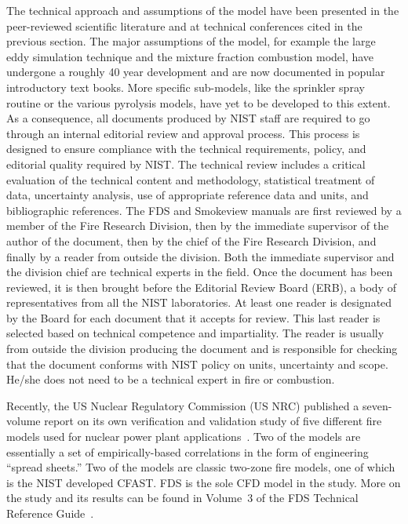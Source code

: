 \documentclass[11pt]{book}
\begin{document}
\label{JustAA}
The technical approach and assumptions of the model have been presented in
the peer-reviewed scientific literature and at technical conferences cited in the previous section.
The major assumptions of the model, for example the large eddy simulation technique and the mixture fraction combustion
model, have undergone a roughly 40 year development and are now documented in popular introductory text books.
More specific sub-models, like the sprinkler spray routine or the various pyrolysis models, have yet to be developed to
this extent. As a consequence, all documents produced by NIST staff are required to go
through an internal editorial review and approval process.
This process is designed to ensure compliance with the technical requirements,
policy, and editorial quality required by NIST.
The technical review includes a critical evaluation of the technical content and
methodology, statistical treatment of data, uncertainty analysis, use of appropriate
reference data and units, and bibliographic references.
The FDS and Smokeview manuals are first reviewed by a member of the Fire Research Division,
then by the immediate supervisor of the author of the document,
then by the chief of the Fire Research Division, and finally by a reader from
outside the division. Both the immediate supervisor and the division chief are
technical experts in the field. Once the document has been reviewed, it is
then brought before the Editorial Review Board (ERB),
a body of representatives from all the NIST laboratories.
At least one reader is designated by the Board for each document that it accepts for
review. This last reader is selected based on technical competence and impartiality.
The reader is usually from outside the division producing the document and is
responsible for checking that the document conforms with NIST policy on units, uncertainty
and scope. He/she does not need to be a technical expert in fire or combustion.

Recently, the US Nuclear Regulatory Commission (US NRC) published a seven-volume report on its own verification and validation
study of five different fire models used for nuclear power plant applications~\cite{NUREG_1824}. Two of the models are essentially a set
of empirically-based correlations in the form of engineering ``spread sheets.'' Two of the models are classic two-zone fire models, one of which
is the NIST developed CFAST. FDS is the sole CFD model in the study. More on the study and its results can be found in Volume~3 of the
FDS Technical Reference Guide~\cite{FDS_Tech_Guide_5}.
\end{document}
